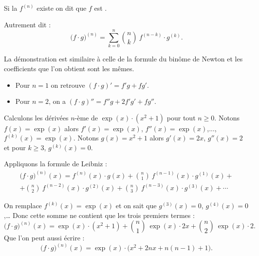 \documentclass[class=report,crop=false]{standalone}
\begin{document}
Si la  $f^{(n)}$ existe  on dit que $f$ est .


\begin{theoreme}
\sauteligne
{}
\end{theoreme}

Autrement dit :
$$\big( f \cdot g \big)^{(n)} = \sum_{k=0}^n \binom{n}{k} \ f^{(n-k)} \cdot g^{(k)}.$$

La démonstration est similaire à celle de la formule du binôme de Newton
et les coefficients que l'on obtient sont les mêmes.
\begin{exemple}
\sauteligne
\begin{itemize}
  \item Pour $n=1$ on retrouve $(f\cdot g)'= f' g + f g'$.
  \item Pour $n=2$, on a $(f\cdot g)''= f''g + 2f' g' + fg''$.
\end{itemize}
\end{exemple}


\begin{exemple}
Calculons les dérivées $n$-ème de $\exp(x) \cdot (x^2+1)$ pour tout $n \ge 0$.
Notons $f(x)=\exp(x)$ alors $f'(x)=\exp(x)$, $f''(x)=\exp(x)$,..., $f^{(k)}(x)=\exp(x)$.
Notons $g(x)=x^2+1$ alors $g'(x)=2x$, $g''(x)=2$ et pour $k\ge 3$, $g^{(k)}(x)=0$.


Appliquons la formule de Leibniz :
\begin{multline*}
\big( f \cdot g \big)^{(n)}(x) =  f^{(n)}(x) \cdot g(x) + \binom{n}{1}\ f^{(n-1)}(x)\cdot g^{(1)}(x)
+\\
+\binom{n}{2}\  f^{(n-2)}(x)\cdot g^{(2)}(x) + \binom{n}{3}\ f^{(n-3)}(x)\cdot g^{(3)}(x) + \cdots
\end{multline*}

On remplace $f^{(k)}(x)=\exp(x)$ et on sait que $g^{(3)}(x)=0$, $g^{(4)}(x)=0$,\ldots
Donc cette somme ne contient que les trois premiers termes :
$$\big( f \cdot g \big)^{(n)}(x) =  \exp(x) \cdot (x^2+1) + \binom{n}{1}\ \exp(x) \cdot 2x
+ \binom{n}{2}\  \exp(x) \cdot 2.$$
Que l'on peut aussi écrire :
$$\big( f \cdot g \big)^{(n)}(x) =  \exp(x) \cdot \Big(x^2 + 2nx + n(n-1)+1  \Big).$$

\end{exemple}


\end{document}
